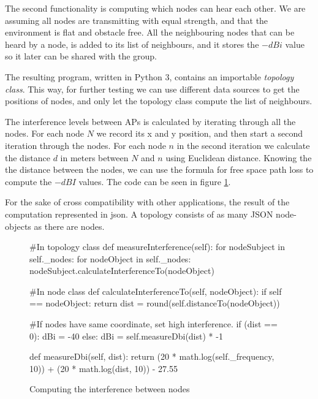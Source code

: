 	The second functionality is computing which nodes can hear each other. We are assuming all nodes
	are transmitting with equal strength, and that the environment is flat and obstacle free. 
	All the neighbouring nodes that can be heard by a node, is added to its list of neighbours, and it stores the $-dBi$ value so it later can be shared with
	the group. 

	The resulting program, written in Python 3\cite{Python3}, contains an importable \textit{topology class}. This way, for further testing we can use different data sources to get the positions of nodes,
	and only let the topology class compute the list of neighbours. 

	The interference levels between APs is calculated by iterating through all the nodes. For each node $N$ we record its x and y position,
	and then start a second iteration through the nodes. For each node $n$ in the second iteration we calculate the distance $d$ in
	meters between $N$ and $n$ using Euclidean distance. Knowing the the distance between the nodes,  we can use the formula for free space path loss \cite{FSPL} to compute the $-dBI$ values. The code can be seen in figure \ref{fig:dbiCreation}.


	For the sake of cross compatibility with other applications, the result of the computation represented in json. A topology consists of as many JSON node-objects as there are nodes.

	\begin{figure}[H]
	\begin{python}
#In topology class
def measureInterference(self):
 for nodeSubject in self._nodes:  
  for nodeObject in self._nodes:
    nodeSubject.calculateInterferenceTo(nodeObject) 

#In node class
def calculateInterferenceTo(self, nodeObject):
 if self == nodeObject:
  return
 dist = round(self.distanceTo(nodeObject))

#If  nodes have same coordinate, set high interference. 
 if (dist == 0):
  dBi = -40
 else:
  dBi  = self.measureDbi(dist) * -1

def measureDbi(self, dist):
 return (20 * math.log(self._frequency, 10)) + 
(20 * math.log(dist, 10)) - 27.55

			\end{python}
			\caption{Computing the interference between nodes}
			\label{fig:dbiCreation}
			\end{figure}
